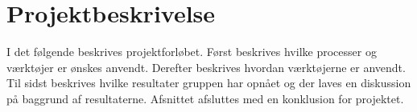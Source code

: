 \chapter{Projektbeskrivelse}
I det følgende beskrives projektforløbet. Først beskrives hvilke processer og værktøjer er ønskes anvendt. Derefter beskrives hvordan værktøjerne er anvendt. Til sidst beskrives hvilke resultater gruppen har opnået og der laves en diskussion på baggrund af resultaterne. Afsnittet afsluttes med en konklusion for projektet.



\newpage


\newpage


\newpage


\newpage





